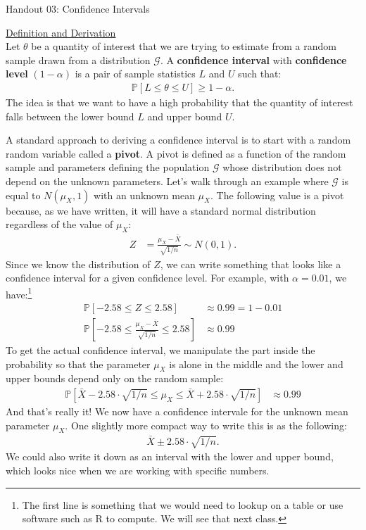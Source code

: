 \documentclass{tufte-handout}
\newcommand{\Prob}{\mathbb{P}}
\begin{document}
\justify

{\LARGE Handout 03: Confidence Intervals}

\vspace*{18pt}

\noindent
\underline{Definition and Derivation}\\
Let $\theta$ be a quantity of interest that we are trying to estimate from a
random sample drawn from a distribution $\mathcal{G}$. A \textbf{confidence interval}
with \textbf{confidence level} $(1-\alpha)$ is a pair of sample statistics
$L$ and $U$ such that:
\begin{align*}
\Prob\left[ L \leq \theta \leq U \right] \geq 1 - \alpha.
\end{align*}
The idea is that we want to have a high probability that the quantity of interest
falls between the lower bound $L$ and upper bound $U$.

A standard approach to deriving a confidence interval is to start with a random
random variable called a \textbf{pivot}. A pivot is defined as a function of the
random sample and parameters defining the population $\mathcal{G}$ whose distribution
does not depend on the unknown parameters. Let's walk through an example where
$\mathcal{G}$ is equal to $N(\mu_X, 1)$ with an unknown mean $\mu_X$. The following
value is a pivot because, as we have written, it will have a standard normal
distribution regardless of the value of $\mu_X$:
\begin{align*}
Z &= \frac{\mu_X - \bar{X}}{\sqrt{1/n}} \sim N(0, 1).
\end{align*}
Since we know the distribution of $Z$, we can write something that looks like 
a confidence interval for a given confidence level. For example, with $\alpha = 0.01$,
we have:\footnote{
  The first line is something that we would need to lookup on a table
  or use software such as R to compute. We will see that next class.
}
\begin{align*}
\Prob\left[ -2.58 \leq Z \leq 2.58 \right] &\approx 0.99 = 1 - 0.01 \\
\Prob\left[ -2.58 \leq \frac{\mu_X - \bar{X}}{\sqrt{1/n}} \leq 2.58 \right] &\approx 0.99
\end{align*}
To get the actual confidence interval, we manipulate the part inside the probability
so that the parameter $\mu_X$ is alone in the middle and the lower and upper bounds
depend only on the random sample:
\begin{align*}
\Prob\left[ \bar{X} - 2.58 \cdot \sqrt{1/n} \leq \mu_X \leq \bar{X} + 2.58 \cdot \sqrt{1/n} \right] &\approx 0.99
\end{align*}
And that's really it! We now have a confidence intervale for the unknown
mean parameter $\mu_X$. One slightly more compact way to write this is 
as the following:
\begin{align*}
\bar{X} \pm 2.58 \cdot \sqrt{1/n}.
\end{align*}
We could also write it down as an interval with the lower and upper bound,
which looks nice when we are working with specific numbers.
\end{document}
